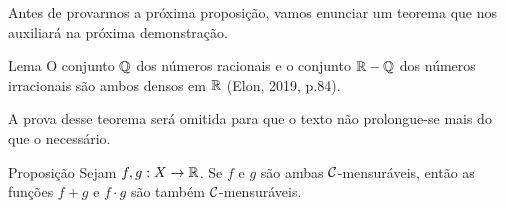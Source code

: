 Antes de provarmos a próxima proposição, vamos enunciar um teorema que nos auxiliará na próxima demonstração. 
\begin{env}{Lema}
	\label{lem:densidade de Q em R}
	O conjunto $\operatorname{\mathbb{Q}}$ dos números racionais e o conjunto
	$\mathbb{R} - \operatorname{\mathbb{Q}}$ dos números irracionais são ambos densos em $\mathbb{R}$ (Elon, 2019, p.84).
	\vspace{-0.2cm}
\end{env}
A prova desse teorema será omitida para que o texto não prolongue-se mais do que o necessário.
\begin{env}{Proposição}
\label{prop:aritmetica-duas-funcoes}
    Sejam $f,g:X \to \mathbb{R}$. Se $f$ e $g$ são ambas $\operatorname{\mathcal{C}}$-mensuráveis, então as funções $f+g$ e $f\cdot g$ são também $\operatorname{\mathcal{C}}$-mensuráveis.
    \vspace{-0.2cm}
\end{env}

